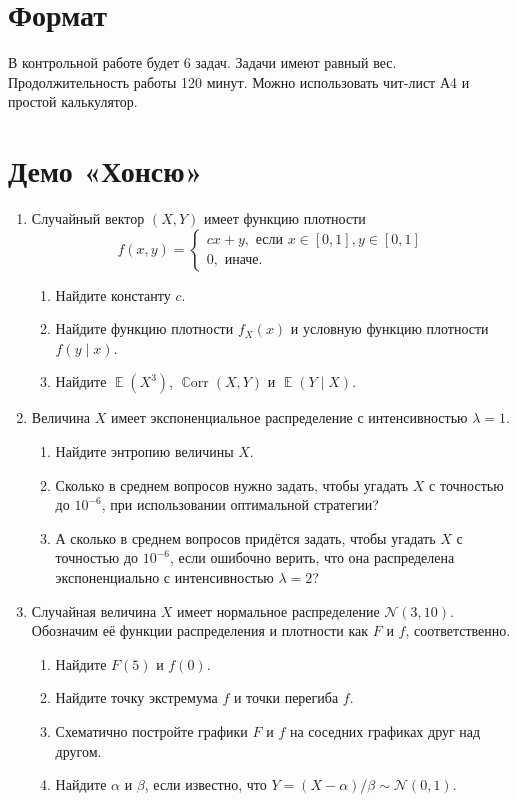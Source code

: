 \documentclass[12pt]{article}
\DeclareMathOperator{\Corr}{\mathbb{C}orr}
\DeclareMathOperator{\E}{\mathbb{E}}
\newcommand \cN{\mathcal{N}}
\begin{document}
\section*{Формат}

В контрольной работе будет 6 задач. 
Задачи имеют равный вес. 
Продолжительность работы 120 минут. 
Можно использовать чит-лист А4 и простой калькулятор.

\section*{Демо «Хонсю»}
\begin{enumerate}

    \item %
    Случайный вектор $(X, Y)$ имеет функцию плотности 
    \[
    f(x, y) = \begin{cases}
        cx + y, \text{ если } x\in[0,1], y \in [0, 1] \\
        0, \text{ иначе}.    
    \end{cases}
    \]
    \begin{enumerate}
        \item Найдите константу $c$.
        \item Найдите функцию плотности $f_X(x)$ и условную функцию плотности $f(y\mid x)$.
        \item Найдите $\E(X^3)$, $\Corr(X, Y)$ и $\E(Y \mid X)$.
    \end{enumerate}
    
    

    \item %
Величина $X$ имеет экспоненциальное распределение с интенсивностью $\lambda = 1$.
\begin{enumerate}
    \item Найдите энтропию величины $X$.
    \item Сколько в среднем вопросов нужно задать, чтобы угадать $X$ с точностью до $10^{-6}$, при использовании оптимальной стратегии?
    \item А сколько в среднем вопросов придётся задать, чтобы угадать $X$ с точностью до $10^{-6}$, если ошибочно верить, что она распределена экспоненциально с интенсивностью $\lambda = 2$?
\end{enumerate}


    \item %
    Случайная величина $X$ имеет нормальное распределение $\cN(3, 10)$. 
    Обозначим её функции распределения и плотности как $F$ и $f$, соответственно. 
    \begin{enumerate}
        \item Найдите $F(5)$ и $f(0)$.
        \item Найдите точку экстремума $f$ и точки перегиба $f$.
        \item Схематично постройте графики $F$ и $f$ на соседних графиках друг над другом. 
        \item Найдите $\alpha$ и $\beta$, если известно, что $Y = (X - \alpha)/\beta \sim \cN(0, 1)$.  
    \end{enumerate}
    

\end{enumerate}
\end{document}
